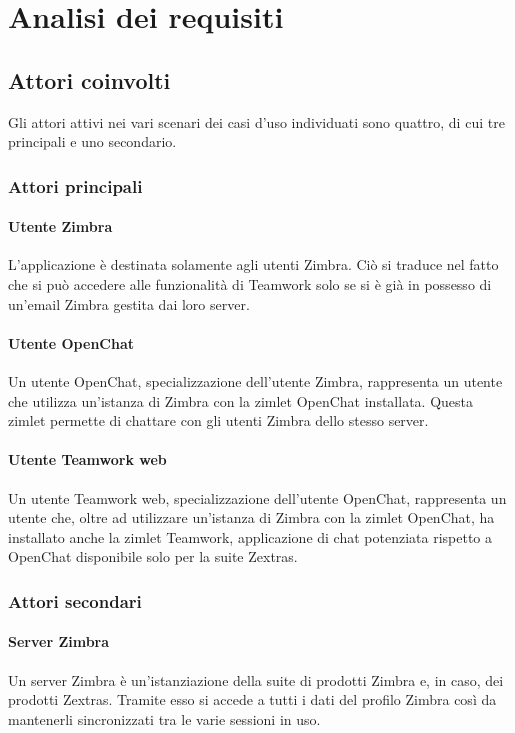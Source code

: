 
\chapter{Analisi dei requisiti}\label{chap:requirements}

\section{Attori coinvolti}
Gli attori attivi nei vari scenari dei casi d'uso individuati sono quattro, di 
cui tre principali e uno secondario.
\subsection{Attori principali}
\subsubsection{Utente Zimbra}
L'applicazione è destinata solamente agli utenti Zimbra. Ciò si traduce nel 
fatto che si può accedere alle funzionalità di Teamwork solo se si è già in 
possesso di un'email Zimbra gestita dai loro server.  
\subsubsection{Utente OpenChat}
Un utente OpenChat, specializzazione dell'utente Zimbra, rappresenta un utente che utilizza un'istanza di Zimbra con la zimlet OpenChat installata. Questa zimlet permette di chattare con gli utenti Zimbra dello stesso server.

\subsubsection{Utente Teamwork web}
Un utente Teamwork web, specializzazione dell'utente OpenChat, rappresenta 
un utente che, oltre ad utilizzare un'istanza di Zimbra con la zimlet OpenChat, 
ha installato anche la zimlet Teamwork, applicazione di chat potenziata rispetto 
a OpenChat disponibile solo per la suite Zextras.

\subsection{Attori secondari}
\subsubsection{Server Zimbra}
Un server Zimbra è un'istanziazione della suite di prodotti Zimbra e, in caso, 
dei prodotti Zextras. Tramite esso si accede a tutti i dati del profilo Zimbra 
così da mantenerli sincronizzati tra le varie sessioni in uso.

